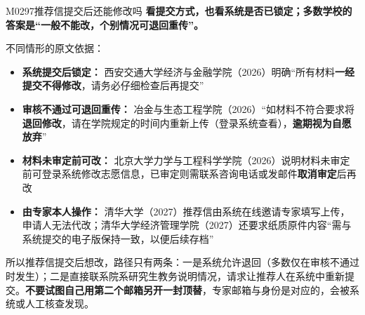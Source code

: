 \begin{qa}{M0297}{推荐信提交后还能修改吗}
\textbf{看提交方式，也看系统是否已锁定；多数学校的答案是“一般不能改，个别情况可退回重传”。}

不同情形的原文依据：

\begin{itemize}
  \item \textbf{系统提交后锁定：} 西安交通大学经济与金融学院（2026）明确“所有材料\textbf{一经提交不得修改}，请务必仔细检查后再提交”
  \item \textbf{审核不通过可退回重传：} 冶金与生态工程学院（2026）“如材料不符合要求将\textbf{退回修改}，请在学院规定的时间内重新上传（登录系统查看），\textbf{逾期视为自愿放弃}”
  \item \textbf{材料未审定前可改：} 北京大学力学与工程科学学院（2026）说明材料未审定前可登录系统修改志愿信息，已审定则需联系咨询电话或发邮件\textbf{取消审定}后再改
  \item \textbf{由专家本人操作：} 清华大学（2027）推荐信由系统在线邀请专家填写上传，申请人无法代改；清华大学经济管理学院（2027）还要求纸质原件内容“需与系统提交的电子版保持一致，以便后续存档”
\end{itemize}

所以推荐信提交后想改，路径只有两条：一是系统允许退回（多数仅在审核不通过时发生）；二是直接联系院系研究生教务说明情况，请求让推荐人在系统中重新提交。\textbf{不要试图自己用第二个邮箱另开一封顶替}，专家邮箱与身份是对应的，会被系统或人工核查发现。
\end{qa}

